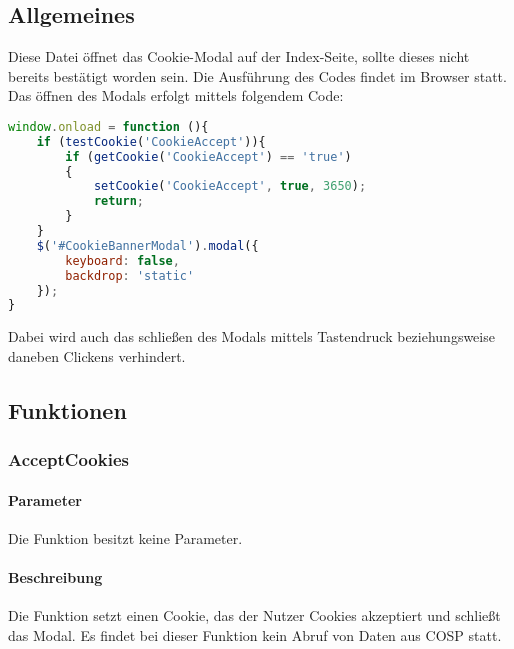 \subsection{Allgemeines} Diese Datei öffnet das Cookie-Modal auf der Index-Seite, sollte dieses nicht bereits bestätigt worden sein.
Die Ausführung des Codes findet im Browser statt. Das öffnen des Modals erfolgt mittels folgendem Code:
\begin{lstlisting}[language=JavaScript]
window.onload = function (){
	if (testCookie('CookieAccept')){
		if (getCookie('CookieAccept') == 'true')
		{
			setCookie('CookieAccept', true, 3650);
			return;
		}
	}
	$('#CookieBannerModal').modal({
		keyboard: false,
		backdrop: 'static'
	});
}
\end{lstlisting}
Dabei wird auch das schließen des Modals mittels Tastendruck beziehungsweise daneben Clickens verhindert.
\subsection{Funktionen}
\subsubsection{AcceptCookies}
\paragraph{Parameter} Die Funktion besitzt keine Parameter.
\paragraph{Beschreibung} Die Funktion setzt einen Cookie, das der Nutzer Cookies akzeptiert und schließt das Modal. Es findet bei dieser Funktion kein Abruf von Daten aus {\glqq COSP\grqq} statt.
